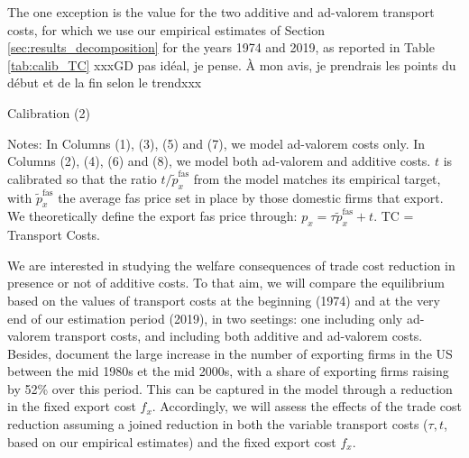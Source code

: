 \documentclass[a4paper,11pt]{article}
\begin{document}
The one exception is the value for the two additive and ad-valorem transport costs, for which we use our empirical estimates of Section \ref{sec:results_decomposition} for the years 1974 and 2019, as reported in Table \ref{tab:calib_TC} xxxGD pas idéal, je pense. À mon avis, je prendrais les points du début et de la fin selon le trendxxx

\begin{table}[htb]
  \centering
  \caption{Calibration (2)}\label{tab:calib_TC}
\begin{center}
	
\end{center}
{\parbox[l]{13cm}{ \vspace{4pt}\footnotesize{Notes: In Columns (1), (3), (5) and (7), we model ad-valorem costs only. In Columns (2), (4), (6) and (8), we model both ad-valorem and additive costs. $t$ is calibrated so that the ratio $t/\widetilde{p}^{\text{fas}}_x$ from the model matches its empirical target, with $\widetilde{p}^{\text{fas}}_x$ the average fas price set in place by those domestic firms that export. We theoretically define the export fas price through: $p_x = \tau \widetilde{p}_x^{\text{fas}} +t$. TC = Transport Costs.}}}
\end{table}

We are interested in studying the welfare consequences of trade cost reduction in presence or not of additive costs. To that aim, we will compare the equilibrium based on the values of transport costs at the beginning (1974) and at the very end of our estimation period (2019), in two seetings: one including only ad-valorem transport costs, and including both additive and ad-valorem costs. Besides, \cite{Lincoln_McCallum2018} document the large increase in the number of exporting firms in the US between the mid 1980s et the mid 2000s, with a share of exporting firms raising by 52\% over this period. This can be captured in the model through a reduction in the fixed export cost $f_x$. Accordingly, we will assess the effects of the trade cost reduction assuming a joined reduction in both the variable transport costs ($\tau, t$, based on our empirical estimates) and the fixed export cost $f_x$.
\end{document}
